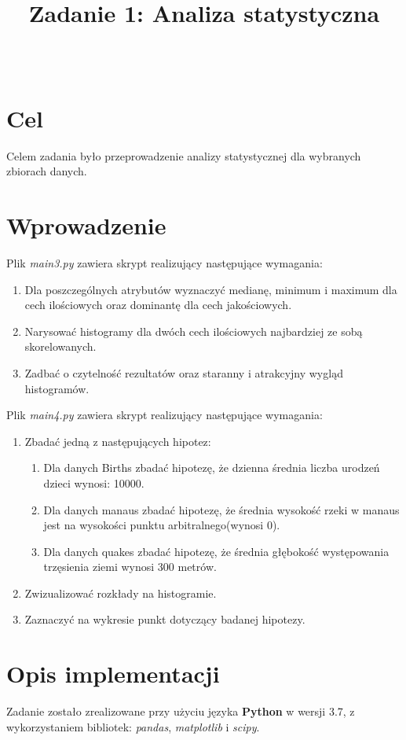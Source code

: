 \documentclass{classrep}
\author{%
  \studentinfo[234102@edu.p.lodz.pl]{Zbigniew Nowacki}{234102}\\
  \studentinfo[234067@edu.p.lodz.pl]{Bartosz Jurczewski}{234067}%
}
\title{Zadanie 1: Analiza statystyczna}
\begin{document}
\maketitle
\thispagestyle{fancyplain}
\section{Cel}
Celem zadania było przeprowadzenie analizy statystycznej dla wybranych zbiorach danych.

\section{Wprowadzenie}
Plik \textit{main3.py} zawiera skrypt realizujący następujące wymagania:
\begin{enumerate}
    \item Dla poszczególnych atrybutów wyznaczyć medianę, minimum i maximum dla cech ilościowych oraz dominantę dla cech jakościowych.
    \item Narysować histogramy dla dwóch cech ilościowych najbardziej ze sobą skorelowanych.
    \item Zadbać o czytelność rezultatów oraz staranny i atrakcyjny wygląd histogramów.
\end{enumerate}
\vspace{0.5cm}
\par Plik \textit{main4.py} zawiera skrypt realizujący następujące wymagania:
\begin{enumerate}
    \item Zbadać jedną z następujących hipotez:
    \begin{enumerate}
        \item Dla danych Births zbadać hipotezę, że dzienna średnia liczba urodzeń dzieci wynosi: 10000.
        \item Dla danych manaus zbadać hipotezę, że średnia wysokość rzeki w manaus jest na wysokości punktu arbitralnego(wynosi 0).
        \item Dla danych quakes zbadać hipotezę, że średnia głębokość występowania trzęsienia ziemi wynosi 300 metrów. 
    \end{enumerate}
    \item Zwizualizować rozkłady na histogramie.
    \item Zaznaczyć na wykresie punkt dotyczący badanej hipotezy.
\end{enumerate}

\section{Opis implementacji}
Zadanie zostało zrealizowane przy użyciu języka \textbf{Python} w wersji 3.7, z wykorzystaniem bibliotek: \textit{pandas}, \textit{matplotlib} i \textit{scipy}.
\end{document}
